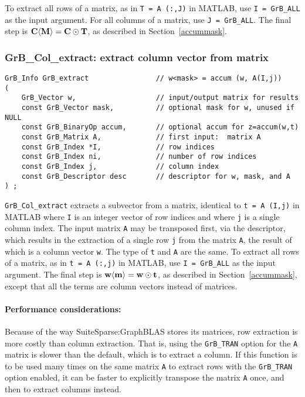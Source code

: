 \documentclass[12pt]{article}
\begin{document}
To extract all rows of a matrix, as in \verb'T = A (:,J)' in MATLAB, use
\verb'I = GrB_ALL' as the input argument.  For all columns of a matrix, use
\verb'J = GrB_ALL'.  The final step is ${\bf C \langle M \rangle  = C \odot
T}$, as described in Section~\ref{accummask}.

\newpage
\subsubsection{{\sf GrB\_Col\_extract:} extract column vector from matrix}
\label{extract_column}

\begin{mdframed}[userdefinedwidth=6in]
{\footnotesize
\begin{verbatim}
GrB_Info GrB_extract                // w<mask> = accum (w, A(I,j))
(
    GrB_Vector w,                   // input/output matrix for results
    const GrB_Vector mask,          // optional mask for w, unused if NULL
    const GrB_BinaryOp accum,       // optional accum for z=accum(w,t)
    const GrB_Matrix A,             // first input:  matrix A
    const GrB_Index *I,             // row indices
    const GrB_Index ni,             // number of row indices
    const GrB_Index j,              // column index
    const GrB_Descriptor desc       // descriptor for w, mask, and A
) ;
\end{verbatim} } \end{mdframed}

\verb'GrB_Col_extract' extracts a subvector from a matrix, identical to
\verb't = A (I,j)' in MATLAB where \verb'I' is an integer vector of row indices
and where \verb'j' is a single column index.  The input matrix \verb'A' may be
transposed first, via the descriptor, which results in the extraction of a
single row \verb'j' from the matrix \verb'A', the result of which is a column
vector \verb'w'.  The type of \verb't' and \verb'A' are the same.  To extract
all rows of a matrix, as in \verb't = A (:,j)' in MATLAB, use
\verb'I = GrB_ALL' as the input argument.  The final step is ${\bf w \langle m
\rangle  = w \odot t}$, as described in Section~\ref{accummask}, except that
all the terms are column vectors instead of matrices.

\paragraph{Performance considerations:} Because of the way
SuiteSparse:Graph\-BLAS stores its matrices, row extraction is more costly than
column extraction.  That is, using the \verb'GrB_TRAN' option for the \verb'A'
matrix is slower than the default, which is to extract a column.  If this
function is to be used many times on the same matrix \verb'A' to extract rows
with the \verb'GrB_TRAN' option enabled, it can be faster to explicitly
transpose the matrix \verb'A' once, and then to extract columns instead.
\end{document}

